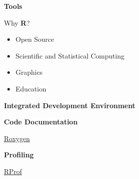 \begin{frame} 
\begin{center}\textbf{\huge Tools}\end{center}
\end{frame}

\begin{frame}\vspace{0cm}
\begin{center}
\end{center}
Why \textbf{\textsf{R}}?\vspace{0.3cm}
\begin{itemize}
\item Open Source\vspace{0.2cm}
\item Scientific and Statistical Computing\vspace{0.2cm}
\item Graphics\vspace{0.2cm}
\item Education
\end{itemize}

\end{frame}



\begin{frame}\textbf{\Large Integrated Development Environment}\vspace{1cm}
\begin{center}
\end{center}
\end{frame}

\begin{frame}\textbf{\Large Code Documentation}\vspace{1cm}
\begin{center}
\href{http://roxygen.org/}{\Huge \textsf{R}oxygen}
\end{center}
\end{frame}

\begin{frame}\textbf{\Large Profiling}\vspace{1cm}
\begin{center}
\href{http://stat.ethz.ch/R-manual/R-patched/library/utils/html/Rprof.html}{\Huge \textsf{R}Prof}
\end{center}
\end{frame}


